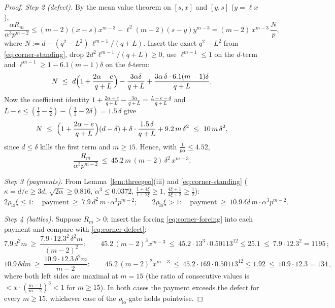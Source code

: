\documentclass[11pt]{article}
\begin{document}
\begin{proof}
\emph{Step 2 (defect).}  By the mean value theorem on $[s,x]$ and $[y,s]$
($y=\ell x$),
\[
        \frac{\alpha R_m}{\alpha^3 p^{m-2}}
        \le(m-2)(x-s)x^{m-3}-\ell^2(m-2)(s-y)y^{m-3}
        =(m-2)\,x^{m-3}\,\frac Np,
\]
where $N:=d-(q^2-L^2)\,\ell^{m-1}/(q+L)$.  Insert the exact
$q^2-L^2$ from \eqref{eq:corner-standing}, drop $2d^2\ell^{m-1}/(q+L)\ge0$,
use $\ell^{m-1}\le1$ on the $d$-term and
$\ell^{m-1}\ge1-6.1(m-1)\delta$ on the $\delta$-term:
\[
        N\ \le\ d\Bigl(1+\frac{2\alpha-e}{q+L}\Bigr)
        -\frac{3\alpha\delta}{q+L}
        +\frac{3\alpha\,\delta\cdot6.1(m-1)\delta}{q+L}.
\]
Now the coefficient identity
$1+\frac{2\alpha-e}{q+L}-\frac{3\alpha}{q+L}=\frac{L-e-d}{q+L}$ and
$L-e\le(\tfrac13-\tfrac\delta2)-(\tfrac13-2\delta)=1.5\,\delta$ give
\[
        N\ \le\
        \Bigl(1+\frac{2\alpha-e}{q+L}\Bigr)(d-\delta)
        +\delta\cdot\frac{1.5\,\delta}{q+L}
        +9.2\,m\,\delta^2
        \ \le\ 10\,m\,\delta^2 ,
\]
since $d\le\delta$ kills the first term and $m\ge15$.  Hence, with
$\tfrac1{p\alpha}\le4.52$,
\begin{equation}\label{eq:corner-defect}
        \frac{R_m}{\alpha^3p^{m-2}}\ \le\ 45.2\,m\,(m-2)\,\delta^2\,x^{m-3}.
\end{equation}

\emph{Step 3 (payments).}  From Lemma~\ref{lem:threegeo}(iii) and
\eqref{eq:corner-standing} ($\kappa=d/e\ge3d$, $\sqrt{2\alpha}\ge0.816$,
$\alpha^3\le0.0372$, $\tfrac{1+4\xi}{1+2\xi}\ge1$,
$\tfrac{4\xi+1}{4\xi+2}\ge\tfrac12$):
\[
        2\rho_{\mathrm{lo}}\xi\le1:\quad
        \text{payment}\ \ge\ 7.9\,d^2\,m\cdot\alpha^3p^{m-2};
        \qquad
        2\rho_{\mathrm{lo}}\xi>1:\quad
        \text{payment}\ \ge\ 10.9\,\delta d\,m\cdot\alpha^3p^{m-2}.
\]

\emph{Step 4 (battles).}  Suppose $R_m>0$; insert the forcing
\eqref{eq:corner-forcing} into each payment and compare with
\eqref{eq:corner-defect}:
\[
        7.9\,d^2m\ \ge\ \frac{7.9\cdot12.3^2\,\delta^2m}{(m-2)^2}:
        \qquad
        45.2\,(m-2)^3x^{m-3}\ \le\ 45.2\cdot13^3\cdot0.50113^{12}\le25.1
        \ \le\ 7.9\cdot12.3^2=1195\,;
\]
\[
        10.9\,\delta dm\ \ge\ \frac{10.9\cdot12.3\,\delta^2m}{m-2}:
        \qquad
        45.2\,(m-2)^2x^{m-3}\ \le\ 45.2\cdot169\cdot0.50113^{12}\le1.92
        \ \le\ 10.9\cdot12.3=134\,,
\]
where both left sides are maximal at $m=15$
(the ratio of consecutive values is $<x\cdot(\tfrac{m-1}{m-2})^3<1$ for
$m\ge15$).  In both cases the payment exceeds the defect for every $m\ge15$,
whichever case of the $\rho_{\mathrm{lo}}$-gate holds pointwise.
\end{proof}
\end{document}
